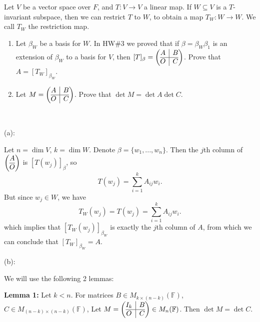 \documentclass{eh-homework}
\begin{document}
    \newpage
    \begin{question}{6}
    Let $V$ be a vector space over $F$, and $T : V \to V$ a linear map. If $W \subseteq V$ is a $T$-invariant subspace, then we can restrict \(T\) to \(W\), to obtain a map \(T_W : W \to W\). We call \(T_W\) the restriction map.
    
    \begin{enumerate}[label=(\alph*)]
        \item Let \(\beta _W\) be a basis for \(W\). In HW\#3 we proved that if \(\beta = \beta _W \beta _1\) is an extension of \(\beta_W\) to a basis for \(V\), then \([T]_\beta = \left( \begin{array}{@{}c|c@{}}
            A & B \\
            \hline
            O & C \\
        \end{array}\right)\). Prove that \(A = [T_W]_{\beta_W}\).

        \item Let \(M = \left(\begin{array}{@{}c|c@{}}
            A & B \\
            \hline
            O & C \\
        \end{array}\right)\). Prove that \(\det M = \det A \det C\).
    \end{enumerate}
    \tcblower
    \ 

    (a):

    Let \(n = \dim V\), \(k = \dim W\). Denote \(\beta = \{ w_1, ..., w_n \}\). Then the \(j\)th column of \(\left( \begin{array}{@{}c@{}}
        A \\
        \hline
        O \\
    \end{array} \right)\) is \([T(w_j)]_\beta\), so
    \[
        T(w_j) = \sum_{i=1}^{k} A_{ij} w_i.
    \]
    But since \(w_j \in W\), we have
    \[
        T_W(w_j) = T(w_j) = \sum_{i=1}^{k} A_{ij} w_i.
    \]
    which implies that \([T_W(w_j)]_{\beta_W}\) is exactly the \(j\)th column of \(A\), from which we can conclude that \([T_W]_{\beta_W} = A\).

    \medskip

    (b):

    We will use the following 2 lemmas:

    \textbf{Lemma 1:} Let \(k < n\). For matrices \(B \in M_{k\times (n-k)}(\mathbb{F})\), \(C \in M_{(n-k)\times (n-k)}(\mathbb{F})\), Let \(M = \left( \begin{array}{@{}c|c@{}}
        I_k & B \\
        \hline
        O & C
    \end{array} \right) \in M_n(\mathbb{F})\). Then \(\det M = \det C\).


\end{question}
\end{document}

